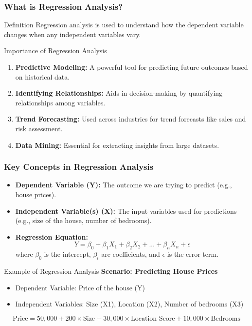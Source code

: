 \documentclass{beamer}
\begin{document}
\begin{frame}[fragile]
    \frametitle{What is Regression Analysis?}
    \begin{block}{Definition}
        Regression analysis is used to understand how the dependent variable changes when any independent variables vary.
    \end{block}
    
    \begin{block}{Importance of Regression Analysis}
        \begin{enumerate}
            \item \textbf{Predictive Modeling:} A powerful tool for predicting future outcomes based on historical data.
            \item \textbf{Identifying Relationships:} Aids in decision-making by quantifying relationships among variables.
            \item \textbf{Trend Forecasting:} Used across industries for trend forecasts like sales and risk assessment.
            \item \textbf{Data Mining:} Essential for extracting insights from large datasets.
        \end{enumerate}
    \end{block}
\end{frame}

\begin{frame}[fragile]
    \frametitle{Key Concepts in Regression Analysis}
    \begin{itemize}
        \item \textbf{Dependent Variable (Y):} The outcome we are trying to predict (e.g., house prices).
        \item \textbf{Independent Variable(s) (X):} The input variables used for predictions (e.g., size of the house, number of bedrooms).
        \item \textbf{Regression Equation:} 
        \begin{equation}
        Y = \beta_0 + \beta_1X_1 + \beta_2X_2 + ... + \beta_nX_n + \epsilon
        \end{equation}
        where \( \beta_0 \) is the intercept, \( \beta_i \) are coefficients, and \( \epsilon \) is the error term.
    \end{itemize}
    
    \begin{block}{Example of Regression Analysis}
        \textbf{Scenario: Predicting House Prices}
        \begin{itemize}
            \item Dependent Variable: Price of the house (Y)
            \item Independent Variables: Size (X1), Location (X2), Number of bedrooms (X3)
        \end{itemize}
        \begin{equation}
        \text{Price} = 50,000 + 200 \times \text{Size} + 30,000 \times \text{Location Score} + 10,000 \times \text{Bedrooms}
        \end{equation}
    \end{block}
\end{frame}
\end{document}
